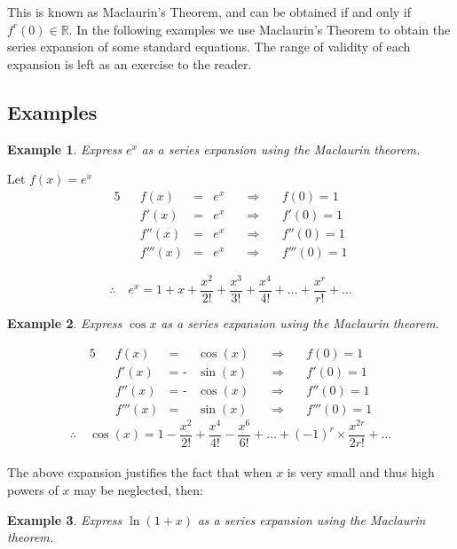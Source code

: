 \documentclass[12pt, a4paper]{report}
\theoremstyle{definition}
\newtheorem{example}{Example}
\begin{document}
	
	This is known as Maclaurin's Theorem, and can be obtained if and only if $f^r(0) \in \mathbb{R}$. In the following examples we use Maclaurin's Theorem to obtain the series expansion of some standard equations. The range of validity of each expansion is left as an exercise to the reader.
	\subsection{Examples}
	\begin{example}
		\emph{Express} $e^x$ \emph{as a series expansion using the Maclaurin theorem.}
	\end{example}
	Let $f(x) = e^x$
	\begin{alignat*}{5}
		&   & f(x)    & = & e^x \quad & \Rightarrow\quad & f(0) = 1    \\
		&   & f'(x)   & = & e^x \quad & \Rightarrow\quad & f'(0) = 1   \\
		&   & f''(x)  & = & e^x \quad & \Rightarrow\quad & f''(0) = 1  \\
		&   & f'''(x) & = & e^x \quad & \Rightarrow\quad & f'''(0) = 1 
	\end{alignat*}
	
	$$\therefore \quad e^x  = 1 + x + \frac{x^2}{2!} + \frac{x^3}{3!} + \frac{x^4}{4!} +\ldots + \frac{x^r}{r!} + \ldots $$
	\hrulefill
	\begin{example}
		\emph{Express} $\cos x$ \emph{as a series expansion using the Maclaurin theorem.}
	\end{example}
	\begin{alignat*}{5}
		&   & f(x)    & =           & \cos (x) \quad & \Rightarrow\quad & f(0) = 1    \\
		&   & f'(x)   & = \text{ -} & \sin (x) \quad & \Rightarrow\quad & f'(0) = 1   \\
		&   & f''(x)  & = \text{ -} & \cos(x) \quad  & \Rightarrow\quad & f''(0) = 1  \\
		&   & f'''(x) & =           & \sin (x) \quad & \Rightarrow\quad & f'''(0) = 1 
	\end{alignat*}
	$$\therefore \quad \cos (x)  = 1 - \frac{x^2}{2!} + \frac{x^4}{4!} -\frac{x^6}{6!}+\ldots + (-1)^r\times\frac{x^{2r}}{2r!} + \ldots $$\\
	The above expansion justifies the fact that when $x$ is very small and thus high powers of $x$ may be neglected, then: \\
	\begin{example}
		\emph{Express} $\ln(1+x)$ \emph{as a series expansion using the Maclaurin theorem.}
	\end{example}
	
\end{document}
